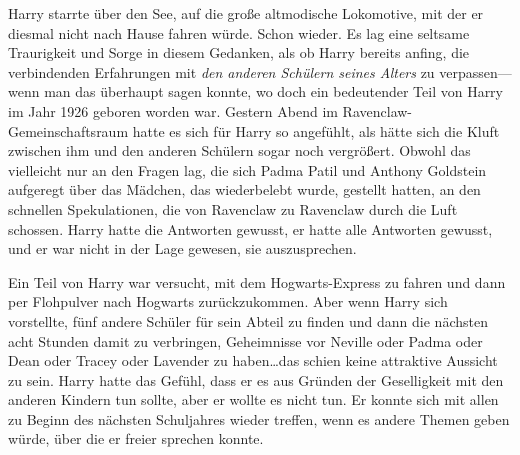 Harry starrte über den See, auf die große altmodische Lokomotive, mit der er diesmal nicht nach Hause fahren würde. Schon wieder. Es lag eine seltsame Traurigkeit und Sorge in diesem Gedanken, als ob Harry bereits anfing, die verbindenden Erfahrungen mit \emph{den anderen Schülern seines Alters} zu verpassen—wenn man das überhaupt sagen konnte, wo doch ein bedeutender Teil von Harry im Jahr 1926 geboren worden war. Gestern Abend im Ravenclaw-Gemeinschaftsraum hatte es sich für Harry so angefühlt, als hätte sich die Kluft zwischen ihm und den anderen Schülern sogar noch vergrößert. Obwohl das vielleicht nur an den Fragen lag, die sich Padma Patil und Anthony Goldstein aufgeregt über das Mädchen, das wiederbelebt wurde, gestellt hatten, an den schnellen Spekulationen, die von Ravenclaw zu Ravenclaw durch die Luft schossen. Harry hatte die Antworten gewusst, er hatte alle Antworten gewusst, und er war nicht in der Lage gewesen, sie auszusprechen.

Ein Teil von Harry war versucht, mit dem Hogwarts-Express zu fahren und dann per Flohpulver nach Hogwarts zurückzukommen. Aber wenn Harry sich vorstellte, fünf andere Schüler für sein Abteil zu finden und dann die nächsten acht Stunden damit zu verbringen, Geheimnisse vor Neville oder Padma oder Dean oder Tracey oder Lavender zu haben…das schien keine attraktive Aussicht zu sein. Harry hatte das Gefühl, dass er es aus Gründen der Geselligkeit mit den anderen Kindern tun sollte, aber er wollte es nicht tun. Er konnte sich mit allen zu Beginn des nächsten Schuljahres wieder treffen, wenn es andere Themen geben würde, über die er freier sprechen konnte.

